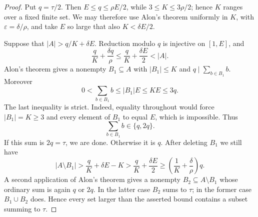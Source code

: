 \documentclass[11pt,reqno]{amsart}
\newcommand{\card}[1]{\lvert #1\rvert}
\begin{document}
\begin{proof}
Put $q=\tau/2$.  Then $E\leq q\leq\rho E/2$, while $3\leq K\leq3\rho/2$; hence $K$ ranges over a fixed finite set.  We may therefore use Alon's theorem uniformly in $K$, with $\varepsilon=\delta/\rho$, and take $E$ so large that also $K<\delta E/2$.

Suppose that $\card A>q/K+\delta E$.  Reduction modulo $q$ is injective on $[1,E]$, and
\[
 \frac{q}{K}+\frac{\delta q}{\rho}
 \leq \frac{q}{K}+\frac{\delta E}{2}<\card A.
\]
Alon's theorem gives a nonempty $B_1\subseteq A$ with $\card{B_1}\leq K$ and $q\mid\sum_{b\in B_1}b$.  Moreover
\[
 0<\sum_{b\in B_1}b\leq \card{B_1}E\leq KE\leq3q.
\]
The last inequality is strict.  Indeed, equality throughout would force $\card{B_1}=K\geq3$ and every element of $B_1$ to equal $E$, which is impossible.  Thus
\[
 \sum_{b\in B_1}b\in\{q,2q\}.
\]
If this sum is $2q=\tau$, we are done.  Otherwise it is $q$.  After deleting $B_1$ we still have
\[
 \card{A\setminus B_1}>\frac{q}{K}+\delta E-K
 >\frac qK+\frac{\delta E}{2}
 \geq\left(\frac1K+\frac\delta\rho\right)q.
\]
A second application of Alon's theorem gives a nonempty $B_2\subseteq A\setminus B_1$ whose ordinary sum is again $q$ or $2q$.  In the latter case $B_2$ sums to $\tau$; in the former case $B_1\cup B_2$ does.  Hence every set larger than the asserted bound contains a subset summing to $\tau$.
\end{proof}
\end{document}
